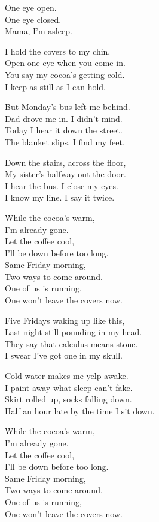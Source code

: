 \begin{lyrics}

One eye open.\\
One eye closed.\\
Mama, I’m asleep.

I hold the covers to my chin,\\
Open one eye when you come in.\\
You say my cocoa’s getting cold.\\
I keep as still as I can hold.

But Monday’s bus left me behind.\\
Dad drove me in. I didn’t mind.\\
Today I hear it down the street.\\
The blanket slips. I find my feet.

Down the stairs, across the floor,\\
My sister’s halfway out the door.\\
I hear the bus. I close my eyes.\\
I know my line. I say it twice.

While the cocoa’s warm,\\
I’m already gone.\\
Let the coffee cool,\\
I’ll be down before too long.\\
Same Friday morning,\\
Two ways to come around.\\
One of us is running,\\
One won’t leave the covers now.


Five Fridays waking up like this,\\
Last night still pounding in my head.\\
They say that calculus means stone.\\
I swear I’ve got one in my skull.

Cold water makes me yelp awake.\\
I paint away what sleep can’t fake.\\
Skirt rolled up, socks falling down.\\
Half an hour late by the time I sit down.

While the cocoa’s warm,\\
I’m already gone.\\
Let the coffee cool,\\
I’ll be down before too long.\\
Same Friday morning,\\
Two ways to come around.\\
One of us is running,\\
One won’t leave the covers now.


\end{lyrics}
